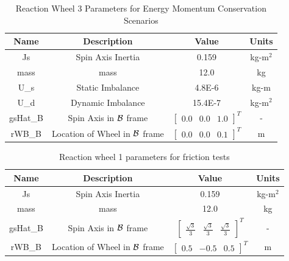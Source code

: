 \begin{table}[htbp]
	\caption{Reaction Wheel 3 Parameters for Energy Momentum Conservation Scenarios}
	\label{tab:rw3}
	\centering \fontsize{10}{10}\selectfont
	\begin{tabular}{ c | c | c | c } %
		\hline
		\textbf{Name}  & \textbf{Description}  & \textbf{Value} & \textbf{Units} \\
		\hline
		Js  & Spin Axis Inertia & 0.159 & kg-m$^2$ \\
		mass & mass & 12.0 & kg \\
		U\_s & Static Imbalance & 4.8E-6 & kg-m \\
		U\_d & Dynamic Imbalance & 15.4E-7 & kg-m$^2$ \\
		gsHat\_B & Spin Axis in $\cal{B}$ frame & $\begin{bmatrix}
		0.0 & 0.0 & 1.0 \end{bmatrix}^T$ & - \\
		rWB\_B & Location of Wheel in $\cal{B}$ frame & $\begin{bmatrix}
		0.0 & 0.0 & 0.1 \end{bmatrix}^T$ & m \\
		\hline
	\end{tabular}
\end{table}

\begin{table}[htbp]
	\caption{Reaction wheel 1 parameters for friction tests}
	\label{tab:rwFriction}
	\centering \fontsize{10}{10}\selectfont
	\begin{tabular}{ c | c | c | c } %
		\hline
		\textbf{Name}  & \textbf{Description}  & \textbf{Value} & \textbf{Units} \\
		\hline
		Js  & Spin Axis Inertia & 0.159 & kg-m$^2$ \\
		mass & mass & 12.0 & kg \\
		gsHat\_B & Spin Axis in $\cal{B}$ frame & $\begin{bmatrix}
		\frac{\sqrt{3}}{3} & \frac{\sqrt{3}}{3} & \frac{\sqrt{3}}{3} \end{bmatrix}^T$ & - \\
		rWB\_B & Location of Wheel in $\cal{B}$ frame & $\begin{bmatrix}
		0.5 & -0.5 & 0.5 \end{bmatrix}^T$ & m \\
		\hline
	\end{tabular}
\end{table}

